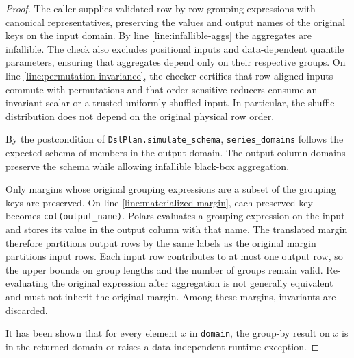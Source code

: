 \documentclass{article}
\begin{document}
\begin{proof}
    The caller supplies validated row-by-row grouping expressions with canonical representatives, preserving the values and output names of the original keys on the input domain.
    By line \ref{line:infallible-aggs} the aggregates are infallible.
    The check also excludes positional inputs and data-dependent quantile
    parameters, ensuring that aggregates depend only on their respective groups.
    On line \ref{line:permutation-invariance}, the checker certifies that
    row-aligned inputs commute with permutations and that order-sensitive
    reducers consume an invariant scalar or a trusted uniformly shuffled input.
    In particular, the shuffle distribution does not depend on the original
    physical row order.

    By the postcondition of \texttt{DslPlan.simulate\_schema},
    \texttt{series\_domains} follows the expected schema of members in the output domain.
    The output column domains preserve the schema while allowing infallible black-box aggregation.

    Only margins whose original grouping expressions are a subset of the grouping keys are preserved.
    On line \ref{line:materialized-margin}, each preserved key becomes \texttt{col(output\_name)}.
    Polars evaluates a grouping expression on the input and stores its value in the output column with that name.
    The translated margin therefore partitions output rows by the same labels as the original margin partitions input rows.
    Each input row contributes to at most one output row,
    so the upper bounds on group lengths and the number of groups remain valid.
    Re-evaluating the original expression after aggregation is not generally equivalent
    and must not inherit the original margin.
    Among these margins, invariants are discarded.

    It has been shown that for every element $x$ in \texttt{domain}, the group-by result on $x$ is in the returned domain or raises a data-independent runtime exception.
\end{proof}
\end{document}

